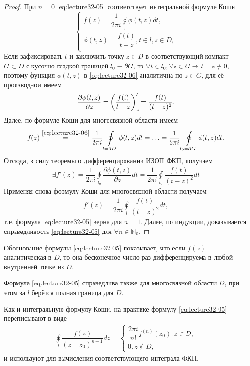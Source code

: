 \begin{proof}
  При $n = 0$ \eqref{eq:lecture32-05} соответствует интегральной формуле Коши
  \begin{equation}
    \label{eq:lecture32-06}
    \begin{cases}
      f(z) =  \dfrac{1}{2\pi i}\oint\limits_l\phi(t, z)dt,\\
      \phi(t, z) = \dfrac{f(t)}{t - z}, t \in l, z \in D,\\
    \end{cases}
  \end{equation}
  Если зафиксировать $t$ и заключить точку $z \in D$ в соответствующий компакт $G \subset D$ с
  кусочно-гладкой границей $l_0 = \partial G$, то $\forall t \in l_0, \forall z \in G \Rightarrow
  t - z \neq 0$, поэтому функция $\phi(t, z)$ в \eqref{eq:lecture32-06} аналитична по $z \in G$, для
  её производной имеем
  \begin{align*}
    \dfrac{\partial \phi(t, z)}{\partial z} = \left( \dfrac{f(t)}{t - z} \right)'_z =
    \dfrac{f(t)}{(t - z)^2}.
  \end{align*}
  Далее, по формуле Коши для многосвязной области имеем
  \begin{align*}
    f(z) \overset{\eqref{eq:lecture32-06}}{=}\dfrac{1}{2\pi i}\oint\limits_{l = \partial D}\phi(t, z)dt
    = \ldots = \dfrac{1}{2\pi i}\oint\limits_{l_0 = \partial G}\phi(t, z)dt.
  \end{align*}
  Отсюда, в силу теоремы о дифференцировании ИЗОП ФКП, получаем
  \begin{align*}
    \exists f'(z) = \dfrac{1}{2\pi i}\oint\limits_{l_0}\dfrac{\partial \phi(t, z)}{\partial z}dt =
    \dfrac{1}{2\pi i}\oint\limits_{l_0}\dfrac{f(t)}{(t - z)^2}dt
  \end{align*}
  Применяя снова формулу Коши для многосвязной области получаем
  \begin{align*}
    f'(z) = \dfrac{1}{2\pi i}\oint\limits_{l}\dfrac{f(t)}{(t - z)^2}dt,
  \end{align*}
  т.е. формула \eqref{eq:lecture32-05} верна для $n = 1$. Далее, по индукции, доказывается
  справедливость \eqref{eq:lecture32-05} для $\forall n \in \mathbb{N}_0$.
\end{proof}
\begin{notes}
\item Обоснование формулы \eqref{eq:lecture32-05} показывает, что если $f(z)$ аналитическая в $D$,
  то она бесконечное число раз дифференцируема в любой внутренней точке из $D$.
\item Формула \eqref{eq:lecture32-05} справедлива также для многосвязной области $D$, при этом
  за $l$ берётся полная граница для $D$.
\item Как и интегральную формулу Коши, на практике формулу \eqref{eq:lecture32-05} переписывают в
  виде
  \begin{align*}
    \oint\limits_l\dfrac{f(z)}{(z - z_0)^{n + 1}}dz =
    \begin{cases}
      \dfrac{2\pi i}{n!}f^{(n)}(z_0), z \in D,\\
      0, z \notin D,
    \end{cases}
  \end{align*}
  и используют для вычисления соответствующего интеграла ФКП.
\end{notes}
